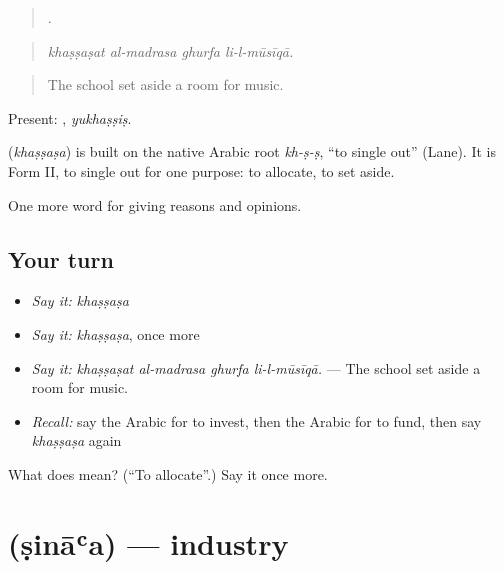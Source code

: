 \begin{quote}
   .
\end{quote}

\begin{quote}
\emph{khaṣṣaṣat al-madrasa ghurfa li-l-mūsīqā.}
\end{quote}

\begin{quote}
The school set aside a room for music.
\end{quote}

Present: , \emph{yukhaṣṣiṣ}.

\begin{cousinweb}
\textbf{} (\emph{khaṣṣaṣa}) is built on the native Arabic root \emph{kh-ṣ-ṣ}, \textquotedblleft{}to single out\textquotedblright{} (Lane). It is Form II, to single out for one purpose: to allocate, to set aside.
\end{cousinweb}

\begin{grammarlens}[title={What you've built}]
One more word for giving reasons and opinions.
\end{grammarlens}

\subsection*{Your turn}
\begin{itemize}
\raggedright
  \item \emph{Say it:} \emph{khaṣṣaṣa}
  \item \emph{Say it:} \emph{khaṣṣaṣa}, once more
  \item \emph{Say it:} \emph{khaṣṣaṣat al-madrasa ghurfa li-l-mūsīqā.} — The school set aside a room for music.
  \item \emph{Recall:} say the Arabic for to invest, then the Arabic for to fund, then say \emph{khaṣṣaṣa} again
\end{itemize}

\begin{tcolorbox}[breakable,colback=teal!4,colframe=teal!35!black,title={Before you move on}]
What does  mean? (\textquotedblleft{}To allocate\textquotedblright{}.) Say it once more.
\end{tcolorbox}
\section[\texorpdfstring{\ar{صناعة} (ṣināʿa)}{صناعة (ṣināʿa)}]{ (ṣināʿa) — industry}


